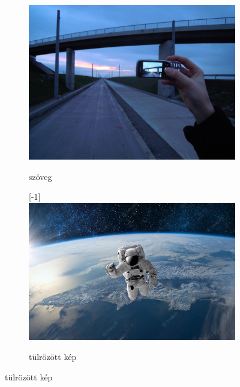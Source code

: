 \documentclass{article}
\begin{document}
\begin{figure}[bt]
\centering
\caption{Felirat/Képaláírás}
\hspace{1em} %

\begin{subfigure}{5cm}
\includegraphics[width=.4\linewidth]{image.png}
\label{felirat}
\caption{szöveg}
\end{subfigure}

\begin{subfigure}{5cm}
\scalebox{1}[-1]{\includegraphics[width=.7\linewidth]{image2.jpg}}
\caption{tülrözött kép}
\label{fig:kepek}
\end{subfigure}
\lipsum

\end{figure}

\newpage
\begin{tabular}{r|ll}

\end{tabular}
\end{document}
